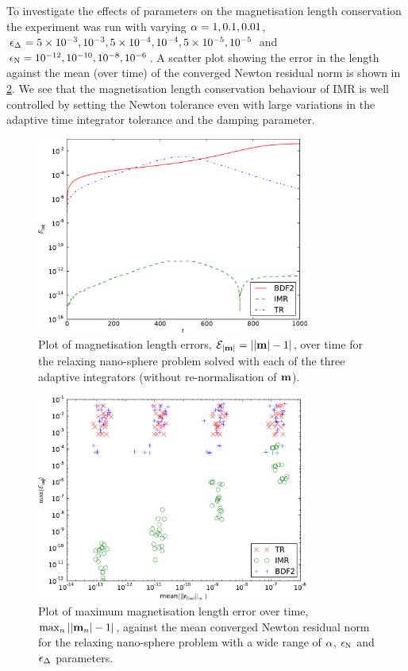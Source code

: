 To investigate the effects of parameters on the magnetisation length conservation the experiment was run with varying $\alpha=1, 0.1, 0.01$, $\epsilon_{\Delta_{}} = 5\times 10^{-3}, 10^{-3}, 5\times10^{-4}, 10^{-4}, 5\times10^{-5}, 10^{-5}$ and $\epsilon_{\mathrm{N}}=10^{-12}, 10^{-10}, 10^{-8}, 10^{-6}$.
A scatter plot showing the error in the length against the mean (over time) of the converged Newton residual norm is shown in \cref{fig:ml-aimr-newton}.
We see that the magnetisation length conservation behaviour of IMR is well controlled by setting the Newton tolerance even with large variations in the adaptive time integrator tolerance and the damping parameter.

\begin{figure}
  \centering
  \includegraphics[width=0.8\textwidth]{plots/ode_llg_adaptive_ml/mlengtherrormaxesvstimes}
  \caption{Plot of magnetisation length errors, $\mathcal{E}_{\left|{\boldsymbol{\mathrm{m}}} \right|} = \left|{\left|{\boldsymbol{\mathrm{m}}} \right| -1} \right|$, over time for the relaxing nano-sphere problem solved with each of the three adaptive integrators (without re-normalisation of $\boldsymbol{\mathrm{m}}$).}
  \label{fig:ml-aimr-ode}
\end{figure}

\begin{figure}
  \centering
  \includegraphics[width=0.8\textwidth]{plots/aimr_ode_llg_ml_sweep/maxofmlengtherrormaxesvsmeanminofnewtonresiduals.pdf}
  \caption{Plot of maximum magnetisation length error over time, $\max_n \left|{\left|{\boldsymbol{\mathrm{m}}_n} \right| -1} \right|$, against the mean converged Newton residual norm for the relaxing nano-sphere problem with a wide range of $\alpha$, $\epsilon_{\mathrm{N}}$ and $\epsilon_{\Delta_{}}$ parameters.}
  \label{fig:ml-aimr-newton}
\end{figure}

